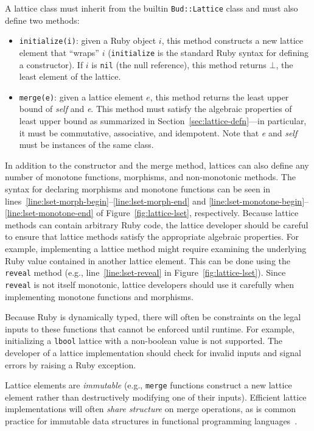 A lattice class must inherit from the builtin \texttt{Bud::Lattice} class and
must also define two methods:
\begin{itemize}
\item \texttt{initialize(i)}: given a Ruby object $i$, this method constructs a
  new lattice element that ``wraps'' $i$ (\texttt{initialize} is the standard
  Ruby syntax for defining a constructor). If $i$ is \texttt{nil} (the null
  reference), this method returns $\bot$, the least element of the lattice.

\item \texttt{merge(e)}: given a lattice element $e$, this method returns the
  least upper bound of \emph{self} and \emph{e}. This method must satisfy the
  algebraic properties of least upper bound as summarized in
  Section~\ref{sec:lattice-defn}---in particular, it must be commutative,
  associative, and idempotent. Note that \emph{e} and \emph{self} must be
  instances of the same class.
\end{itemize}
In addition to the constructor and the merge method, lattices can also define
any number of monotone functions, morphisms, and non-monotonic methods. The
syntax for declaring morphisms and monotone functions can be seen in
lines~\ref{line:lset-morph-begin}--\ref{line:lset-morph-end} and
\ref{line:lset-monotone-begin}--\ref{line:lset-monotone-end} of
Figure~\ref{fig:lattice-lset}, respectively. Because lattice methods can contain
arbitrary Ruby code, the lattice developer should be careful to ensure that
lattice methods satisfy the appropriate algebraic properties. For example,
implementing a lattice method might require examining the underlying Ruby value
contained in another lattice element. This can be done using the \texttt{reveal}
method (e.g., line~\ref{line:lset-reveal} in Figure~\ref{fig:lattice-lset}).
Since \texttt{reveal} is not itself monotonic, lattice developers should use it
carefully when implementing monotone functions and morphisms.

Because Ruby is dynamically typed, there will often be constraints on the legal
inputs to these functions that cannot be enforced until runtime. For example,
initializing a \texttt{lbool} lattice with a non-boolean value is not
supported. The developer of a lattice implementation should check for invalid
inputs and signal errors by raising a Ruby exception.

Lattice elements are \emph{immutable} (e.g., \texttt{merge} functions construct
a new lattice element rather than destructively modifying one of their
inputs). Efficient lattice implementations will often \emph{share structure} on merge
operations, as is common practice for immutable data structures in functional
programming languages~\cite{Okasaki1999}. %

